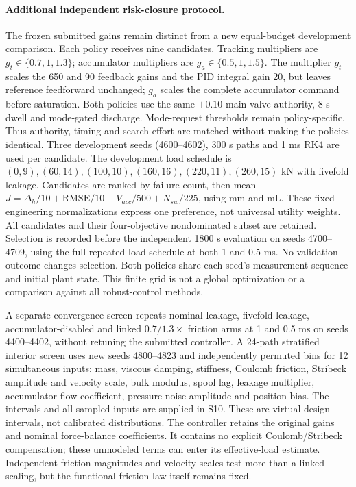 \paragraph{Additional independent risk-closure protocol.}
The frozen submitted gains remain distinct from a new equal-budget development comparison. Each policy receives nine candidates. Tracking multipliers are $g_t\in\{0.7,1,1.3\}$; accumulator multipliers are $g_a\in\{0.5,1,1.5\}$. The multiplier $g_t$ scales the 650 and 90 feedback gains and the PID integral gain 20, but leaves reference feedforward unchanged; $g_a$ scales the complete accumulator command before saturation. Both policies use the same $\pm0.10$ main-valve authority, 8 s dwell and mode-gated discharge. Mode-request thresholds remain policy-specific. Thus authority, timing and search effort are matched without making the policies identical. Three development seeds (4600--4602), 300 s paths and 1 ms RK4 are used per candidate. The development load schedule is $(0,9),(60,14),(100,10),(160,16),(220,11),(260,15)$ kN with fivefold leakage. Candidates are ranked by failure count, then mean $J=\Delta_h/10+\mathrm{RMSE}/10+V_{acc}/500+N_{sw}/225$, using mm and mL. These fixed engineering normalizations express one preference, not universal utility weights. All candidates and their four-objective nondominated subset are retained. Selection is recorded before the independent 1800 s evaluation on seeds 4700--4709, using the full repeated-load schedule at both 1 and 0.5 ms. No validation outcome changes selection. Both policies share each seed's measurement sequence and initial plant state. This finite grid is not a global optimization or a comparison against all robust-control methods.

A separate convergence screen repeats nominal leakage, fivefold leakage, accumulator-disabled and linked $0.7/1.3\times$ friction arms at 1 and 0.5 ms on seeds 4400--4402, without retuning the submitted controller. A 24-path stratified interior screen uses new seeds 4800--4823 and independently permuted bins for 12 simultaneous inputs: mass, viscous damping, stiffness, Coulomb friction, Stribeck amplitude and velocity scale, bulk modulus, spool lag, leakage multiplier, accumulator flow coefficient, pressure-noise amplitude and position bias. The intervals and all sampled inputs are supplied in S10. These are virtual-design intervals, not calibrated distributions. The controller retains the original gains and nominal force-balance coefficients. It contains no explicit Coulomb/Stribeck compensation; these unmodeled terms can enter its effective-load estimate. Independent friction magnitudes and velocity scales test more than a linked scaling, but the functional friction law itself remains fixed.
